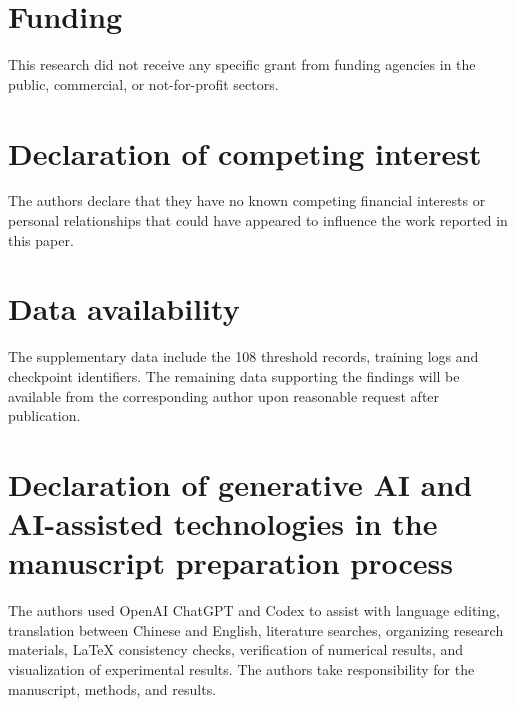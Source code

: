 \documentclass[final,5p,times,twocolumn]{elsarticle}
\begin{document}
\section*{Funding}
This research did not receive any specific grant from funding agencies in the public, commercial, or not-for-profit sectors.

\section*{Declaration of competing interest}
The authors declare that they have no known competing financial interests or personal relationships that could have appeared to influence the work reported in this paper.

\section*{Data availability}
The supplementary data include the 108 threshold records, training logs and checkpoint identifiers. The remaining data supporting the findings will be available from the corresponding author upon reasonable request after publication.

\section*{Declaration of generative AI and AI-assisted technologies in the manuscript preparation process}
The authors used OpenAI ChatGPT and Codex to assist with language editing, translation between Chinese and English, literature searches, organizing research materials, \LaTeX{} consistency checks, verification of numerical results, and visualization of experimental results. The authors take responsibility for the manuscript, methods, and results.
\end{document}
